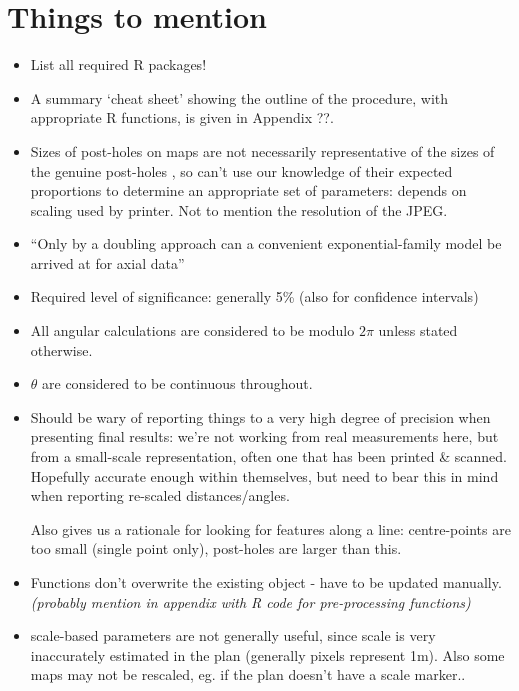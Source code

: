 \documentclass[10pt,fleqn]{article}
\numberwithin{equation}{section}
\begin{document}
\section*{Things to mention}
\begin{itemize}

\item
List all required R packages!

\item
A summary `cheat sheet' showing the outline of the procedure, with appropriate R functions, is given in Appendix ??.

\item
Sizes of post-holes on maps are not necessarily representative of the sizes of the genuine post-holes , so can't use our knowledge of their expected proportions to determine an appropriate set of parameters: depends on scaling used by printer. Not to mention the resolution of the JPEG.

\item 
``Only by a doubling approach can a convenient exponential-family model be arrived at for axial data'' \cite{Arnold2011}

\item
Required level of significance: generally 5\% (also for confidence intervals)

\item
All angular calculations are considered to be modulo $2\pi$ unless stated otherwise.

\item
$\theta$ are considered to be continuous throughout.

\item
Should be wary of reporting things to a very high degree of precision when presenting final results: we're not working from real measurements here, but from a small-scale representation, often one that has been printed \& scanned. Hopefully accurate enough within themselves, but need to bear this in mind when reporting re-scaled distances/angles.

Also gives us a rationale for looking for features along a line: centre-points are too small (single point only), post-holes are larger than this.

\item
Functions don't overwrite the existing object - have to be updated manually.
\textit{(probably mention in appendix with R code for pre-processing functions)
}

\item
scale-based parameters are not generally useful, since scale is very inaccurately estimated in the plan (generally  pixels represent 1m). Also some maps may not be rescaled, eg. if the plan doesn't have a scale marker..

\end{itemize}
\newpage
\end{document}
